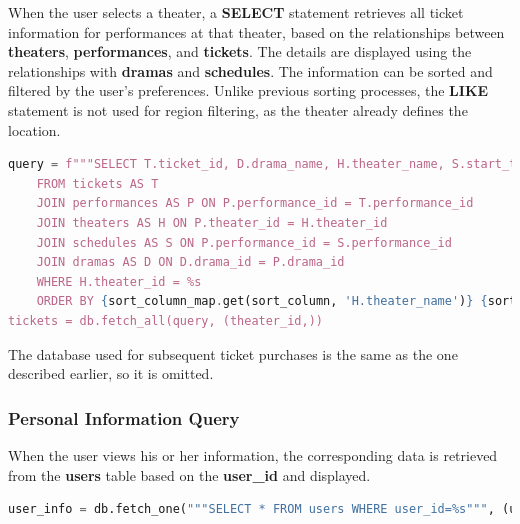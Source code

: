 \documentclass[12pt]{article}
\begin{document}
\par When the user selects a theater, a \textbf{SELECT} statement retrieves all ticket information for performances at that theater, based on the relationships between \textbf{theaters}, \textbf{performances}, and \textbf{tickets}. The details are displayed using the relationships with \textbf{dramas} and \textbf{schedules}. The information can be sorted and filtered by the user's preferences. Unlike previous sorting processes, the \textbf{LIKE} statement is not used for region filtering, as the theater already defines the location.
\begin{tcolorbox}[colframe=black, colback=white, boxrule=0.4mm, sharp corners=southwest, title=Excerpt of Search Tickets Code]
    \begin{lstlisting}[language=Python, breaklines=true]
query = f"""SELECT T.ticket_id, D.drama_name, H.theater_name, S.start_time, S.end_time, T.class, T.price, T.left_tickets
    FROM tickets AS T
    JOIN performances AS P ON P.performance_id = T.performance_id
    JOIN theaters AS H ON P.theater_id = H.theater_id
    JOIN schedules AS S ON P.performance_id = S.performance_id
    JOIN dramas AS D ON D.drama_id = P.drama_id
    WHERE H.theater_id = %s
    ORDER BY {sort_column_map.get(sort_column, 'H.theater_name')} {sort_order_sql}
tickets = db.fetch_all(query, (theater_id,))
\end{lstlisting}
\end{tcolorbox}

\par The database used for subsequent ticket purchases is the same as the one described earlier, so it is omitted.

\subsubsection{Personal Information Query}
\par When the user views his or her information, the corresponding data is retrieved from the \textbf{users} table based on the \textbf{user\_id} and displayed. 
\begin{tcolorbox}[colframe=black, colback=white, boxrule=0.4mm, sharp corners=southwest, title=Excerpt of Search Personal Info Code]
    \begin{lstlisting}[language=Python, breaklines=true]
user_info = db.fetch_one("""SELECT * FROM users WHERE user_id=%s""", (user_id,))
\end{lstlisting}
\end{tcolorbox}
\end{document}
